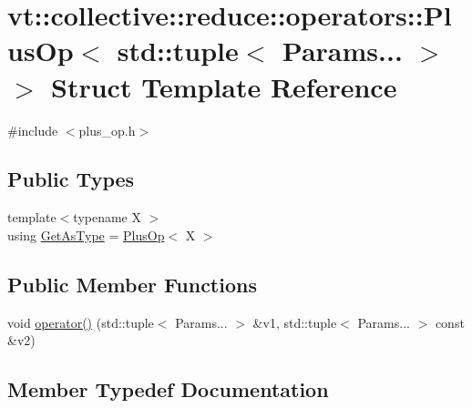 \hypertarget{structvt_1_1collective_1_1reduce_1_1operators_1_1_plus_op_3_01std_1_1tuple_3_01_params_8_8_8_01_4_01_4}{}\section{vt\+:\+:collective\+:\+:reduce\+:\+:operators\+:\+:Plus\+Op$<$ std\+:\+:tuple$<$ Params... $>$ $>$ Struct Template Reference}
\label{structvt_1_1collective_1_1reduce_1_1operators_1_1_plus_op_3_01std_1_1tuple_3_01_params_8_8_8_01_4_01_4}


{\ttfamily \#include $<$plus\+\_\+op.\+h$>$}

\subsection*{Public Types}
\begin{DoxyCompactItemize}
\item 
{\footnotesize template$<$typename X $>$ }\\using \hyperlink{structvt_1_1collective_1_1reduce_1_1operators_1_1_plus_op_3_01std_1_1tuple_3_01_params_8_8_8_01_4_01_4_af17246b42e889a6ac6a257873ba8e5cc}{Get\+As\+Type} = \hyperlink{structvt_1_1collective_1_1reduce_1_1operators_1_1_plus_op}{Plus\+Op}$<$ X $>$
\end{DoxyCompactItemize}
\subsection*{Public Member Functions}
\begin{DoxyCompactItemize}
\item 
void \hyperlink{structvt_1_1collective_1_1reduce_1_1operators_1_1_plus_op_3_01std_1_1tuple_3_01_params_8_8_8_01_4_01_4_a55145dc3f6b44e23f89abed5706506f9}{operator()} (std\+::tuple$<$ Params... $>$ \&v1, std\+::tuple$<$ Params... $>$ const \&v2)
\end{DoxyCompactItemize}


\subsection{Member Typedef Documentation}
\mbox{\label{structvt_1_1collective_1_1reduce_1_1operators_1_1_plus_op_3_01std_1_1tuple_3_01_params_8_8_8_01_4_01_4_af17246b42e889a6ac6a257873ba8e5cc}} 
